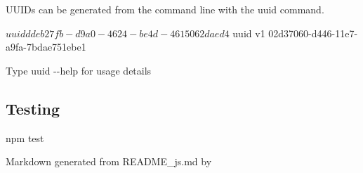 U\+U\+I\+Ds can be generated from the command line with the {\ttfamily uuid} command.


\begin{DoxyCode}
$ uuid
ddeb27fb-d9a0-4624-be4d-4615062daed4

$ uuid v1
02d37060-d446-11e7-a9fa-7bdae751ebe1
\end{DoxyCode}


Type {\ttfamily uuid -\/-\/help} for usage details

\subsection*{Testing}


\begin{DoxyCode}
npm test
\end{DoxyCode}
 

 Markdown generated from R\+E\+A\+D\+M\+E\+\_\+js.md by \href{https://github.com/broofa/runmd}{\tt } 